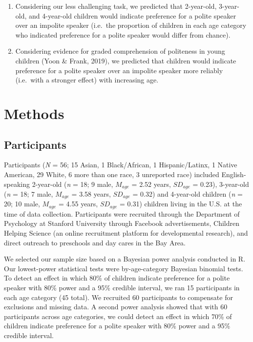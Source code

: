 \documentclass[
  english,
  man,floatsintext]{apa6}
\begin{document}
\begin{enumerate}
\def\labelenumi{\arabic{enumi}.}
\item
  Considering our less challenging task, we predicted that 2-year-old, 3-year-old, and 4-year-old children would indicate preference for a polite speaker over an impolite speaker (i.e.~the proportion of children in each age category who indicated preference for a polite speaker would differ from chance).
\item
  Considering evidence for graded comprehension of politeness in young children (Yoon \& Frank, 2019), we predicted that children would indicate preference for a polite speaker over an impolite speaker more reliably (i.e.~with a stronger effect) with increasing age.
\end{enumerate}

\hypertarget{methods}{%
\section{Methods}\label{methods}}

\hypertarget{participants}{%
\subsection{Participants}\label{participants}}

Participants (\emph{N} = 56; 15 Asian, 1 Black/African, 1 Hispanic/Latinx, 1 Native American, 29 White, 6 more than one race, 3 unreported race) included English-speaking 2-year-old (\emph{n} = 18; 9 male, \(M_{age}\) = 2.52 years, \(SD_{age}\) = 0.23), 3-year-old (\emph{n} = 18; 7 male, \(M_{age}\) = 3.58 years, \(SD_{age}\) = 0.32) and 4-year-old children (\emph{n} = 20; 10 male, \(M_{age}\) = 4.55 years, \(SD_{age}\) = 0.31) children living in the U.S. at the time of data collection. Participants were recruited through the Department of Psychology at Stanford University through Facebook advertisements, Children Helping Science (an online recruitment platform for developmental research), and direct outreach to preschools and day cares in the Bay Area.

We selected our sample size based on a Bayesian power analysis conducted in R. Our lowest-power statistical tests were by-age-category Bayesian binomial tests. To detect an effect in which 80\% of children indicate preference for a polite speaker with 80\% power and a 95\% credible interval, we ran 15 participants in each age category (45 total). We recruited 60 participants to compensate for exclusions and missing data. A second power analysis showed that with 60 participants across age categories, we could detect an effect in which 70\% of children indicate preference for a polite speaker with 80\% power and a 95\% credible interval.
\end{document}
